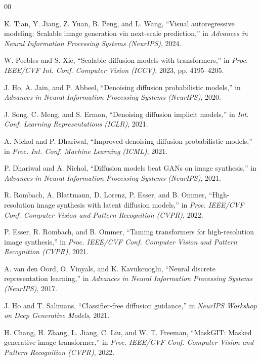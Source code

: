 \documentclass[conference]{IEEEtran}
\begin{document}
\begin{thebibliography}{00}

 K. Tian, Y. Jiang, Z. Yuan, B. Peng, and L. Wang,
``Visual autoregressive modeling: Scalable image generation via next-scale prediction,''
in \emph{Advances in Neural Information Processing Systems (NeurIPS)}, 2024.

 W. Peebles and S. Xie,
``Scalable diffusion models with transformers,''
in \emph{Proc. IEEE/CVF Int. Conf. Computer Vision (ICCV)}, 2023, pp. 4195--4205.

 J. Ho, A. Jain, and P. Abbeel,
``Denoising diffusion probabilistic models,''
in \emph{Advances in Neural Information Processing Systems (NeurIPS)}, 2020.

 J. Song, C. Meng, and S. Ermon,
``Denoising diffusion implicit models,''
in \emph{Int. Conf. Learning Representations (ICLR)}, 2021.

 A. Nichol and P. Dhariwal,
``Improved denoising diffusion probabilistic models,''
in \emph{Proc. Int. Conf. Machine Learning (ICML)}, 2021.

 P. Dhariwal and A. Nichol,
``Diffusion models beat GANs on image synthesis,''
in \emph{Advances in Neural Information Processing Systems (NeurIPS)}, 2021.

 R. Rombach, A. Blattmann, D. Lorenz, P. Esser, and B. Ommer,
``High-resolution image synthesis with latent diffusion models,''
in \emph{Proc. IEEE/CVF Conf. Computer Vision and Pattern Recognition (CVPR)}, 2022.

 P. Esser, R. Rombach, and B. Ommer,
``Taming transformers for high-resolution image synthesis,''
in \emph{Proc. IEEE/CVF Conf. Computer Vision and Pattern Recognition (CVPR)}, 2021.

 A. van den Oord, O. Vinyals, and K. Kavukcuoglu,
``Neural discrete representation learning,''
in \emph{Advances in Neural Information Processing Systems (NeurIPS)}, 2017.

 J. Ho and T. Salimans,
``Classifier-free diffusion guidance,''
in \emph{NeurIPS Workshop on Deep Generative Models}, 2021.

 H. Chang, H. Zhang, L. Jiang, C. Liu, and W. T. Freeman,
``MaskGIT: Masked generative image transformer,''
in \emph{Proc. IEEE/CVF Conf. Computer Vision and Pattern Recognition (CVPR)}, 2022.


\end{thebibliography}
\end{document}
